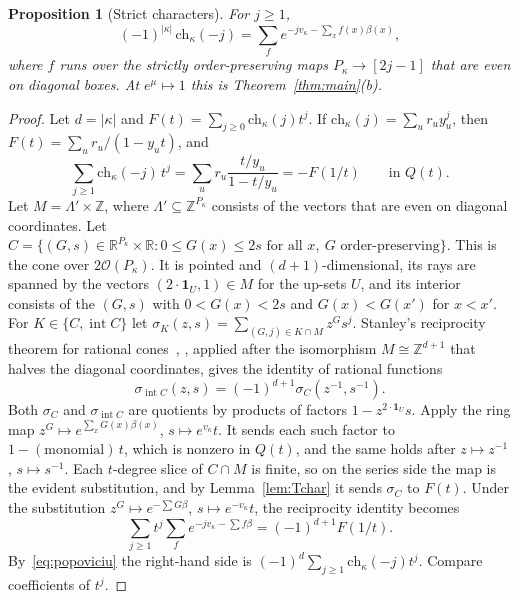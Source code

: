 \documentclass[11pt]{amsart}
\newtheorem{proposition}[theorem]{Proposition}
\theoremstyle{definition}
\theoremstyle{remark}
\newcommand{\Z}{\mathbb{Z}}
\newcommand{\R}{\mathbb{R}}
\newcommand{\ord}{\mathcal{O}}
\newcommand{\interior}{\operatorname{int}}
\begin{document}
\begin{proposition}[Strict characters]\label{prop:strictchar}
For $j\ge1$,
\[ (-1)^{|\kappa|}\,\mathrm{ch}_\kappa(-j)=\sum_f e^{-jv_\kappa-\sum_xf(x)\beta(x)}, \]
where $f$ runs over the strictly order-preserving maps $P_\kappa\to[2j-1]$ that are even on
diagonal boxes. At $e^\mu\mapsto1$ this is Theorem~\ref{thm:main}(b).
\end{proposition}

\begin{proof}
Let $d=|\kappa|$ and $F(t)=\sum_{j\ge0}\mathrm{ch}_\kappa(j)t^j$. If
$\mathrm{ch}_\kappa(j)=\sum_ur_uy_u^j$, then $F(t)=\sum_ur_u/(1-y_ut)$, and
\begin{equation}\label{eq:popoviciu}
\sum_{j\ge1}\mathrm{ch}_\kappa(-j)\,t^j=\sum_ur_u\frac{t/y_u}{1-t/y_u}=-F(1/t)\qquad\text{in }Q(t).
\end{equation}
Let $M=\Lambda'\times\Z$, where $\Lambda'\subseteq\Z^{P_\kappa}$ consists of the vectors that are even
on diagonal coordinates. Let
$C=\{(G,s)\in\R^{P_\kappa}\times\R:0\le G(x)\le2s\text{ for all }x,\ G\text{ order-preserving}\}$.
This is the cone over $2\ord(P_\kappa)$. It is pointed and $(d+1)$-dimensional, its rays are
spanned by the vectors $(2\cdot\mathbf 1_U,1)\in M$ for the up-sets $U$, and its interior consists of
the $(G,s)$ with $0<G(x)<2s$ and $G(x)<G(x')$ for $x<x'$. For $K\in\{C,\interior C\}$ let
$\sigma_K(z,s)=\sum_{(G,j)\in K\cap M}z^Gs^j$. Stanley's reciprocity theorem for rational
cones~\cite{Stanley74}, \cite[Ch.~4]{BeckRobins}, applied after the isomorphism $M\cong\Z^{d+1}$ that halves
the diagonal coordinates, gives the identity of rational functions
\[ \sigma_{\interior C}(z,s)=(-1)^{d+1}\sigma_C(z^{-1},s^{-1}). \]
Both $\sigma_C$ and $\sigma_{\interior C}$ are quotients by products of factors
$1-z^{2\cdot\mathbf 1_U}s$. Apply the ring map $z^G\mapsto e^{\sum_xG(x)\beta(x)}$,
$s\mapsto e^{v_\kappa}t$. It sends each such factor to $1-(\text{monomial})\,t$, which is nonzero in
$Q(t)$, and the same holds after $z\mapsto z^{-1}$, $s\mapsto s^{-1}$. Each $t$-degree slice of
$C\cap M$ is finite, so on the series side the map is the evident substitution, and by
Lemma~\ref{lem:Tchar} it sends $\sigma_C$ to $F(t)$. Under the substitution
$z^G\mapsto e^{-\sum G\beta}$, $s\mapsto e^{-v_\kappa}t$, the reciprocity identity becomes
\[ \sum_{j\ge1}t^j\sum_fe^{-jv_\kappa-\sum f\beta}=(-1)^{d+1}F(1/t). \]
By~\eqref{eq:popoviciu} the right-hand side is $(-1)^d\sum_{j\ge1}\mathrm{ch}_\kappa(-j)t^j$. Compare
coefficients of $t^j$.
\end{proof}
\end{document}
